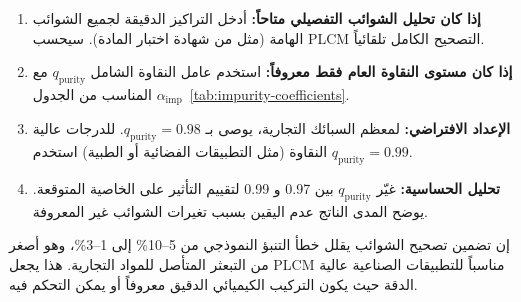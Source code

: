 \documentclass[11pt,a4paper]{article}
\begin{document}
\begin{otherlanguage}{arabic}
		\begin{enumerate}
			\item \textbf{إذا كان تحليل الشوائب التفصيلي متاحاً:} أدخل التراكيز الدقيقة لجميع الشوائب الهامة (مثل من شهادة اختبار المادة). سيحسب PLCM التصحيح الكامل تلقائياً.
			\item \textbf{إذا كان مستوى النقاوة العام فقط معروفاً:} استخدم عامل النقاوة الشامل \(q_{\mathrm{purity}}\) مع \(\alpha_{\mathrm{imp}}\) المناسب من الجدول~\ref{tab:impurity-coefficients}.
			\item \textbf{الإعداد الافتراضي:} لمعظم السبائك التجارية، يوصى بـ \(q_{\mathrm{purity}} = 0.98\). للدرجات عالية النقاوة (مثل التطبيقات الفضائية أو الطبية) استخدم \(q_{\mathrm{purity}} = 0.99\).
			\item \textbf{تحليل الحساسية:} غيّر \(q_{\mathrm{purity}}\) بين 0.97 و 0.99 لتقييم التأثير على الخاصية المتوقعة. يوضح المدى الناتج عدم اليقين بسبب تغيرات الشوائب غير المعروفة.
		\end{enumerate}
		
		إن تضمين تصحيح الشوائب يقلل خطأ التنبؤ النموذجي من 5–10\% إلى 1–3\%، وهو أصغر من التبعثر المتأصل للمواد التجارية. هذا يجعل PLCM مناسباً للتطبيقات الصناعية عالية الدقة حيث يكون التركيب الكيميائي الدقيق معروفاً أو يمكن التحكم فيه.
		
	\end{otherlanguage}
	
\end{document}
